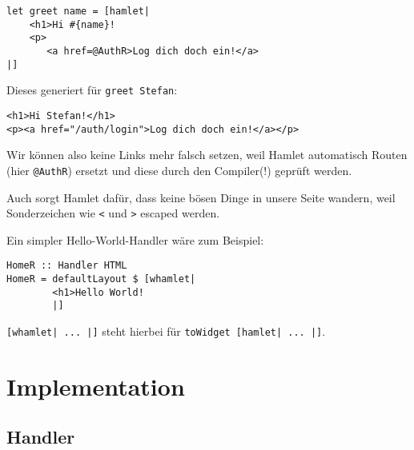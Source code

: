 \documentclass{beamer}
\begin{document}
\begin{frame}[fragile]
\begin{verbatim}
let greet name = [hamlet|
    <h1>Hi #{name}!
    <p>
       <a href=@AuthR>Log dich doch ein!</a>
|]
\end{verbatim}
\pause
Dieses generiert für \texttt{greet \glqq Stefan\grqq}:
\begin{verbatim}
<h1>Hi Stefan!</h1>
<p><a href="/auth/login">Log dich doch ein!</a></p>
\end{verbatim}
\pause
Wir können also keine Links mehr falsch setzen, weil Hamlet automatisch Routen (hier \texttt{@AuthR}) ersetzt und diese durch den Compiler(!) geprüft werden.\\\pause\par
Auch sorgt Hamlet dafür, dass keine bösen Dinge in unsere Seite wandern, weil Sonderzeichen wie \texttt{<} und \texttt{>} escaped werden.
\end{frame}

\begin{frame}[fragile]
Ein simpler Hello-World-Handler wäre zum Beispiel:
\begin{verbatim}
HomeR :: Handler HTML
HomeR = defaultLayout $ [whamlet|
        <h1>Hello World!
        |]
\end{verbatim}
\pause
\texttt{[whamlet| ... |]} steht hierbei für \texttt{toWidget [hamlet| ... |]}.
\end{frame}

\section{Implementation}

\subsection{Handler}
\end{document}
